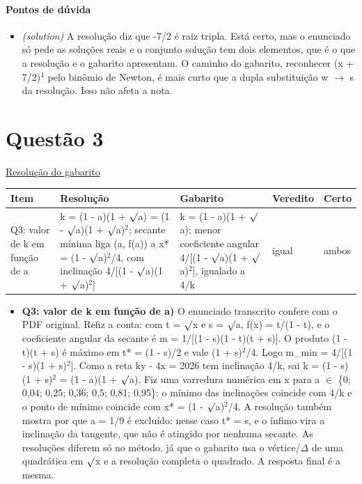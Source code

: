 \documentclass{article}%
\begin{document}
\paragraph{Pontos de dúvida}%
\begin{itemize}%
\item%
\textit{(solution)} A resolução diz que -7/2 é raiz tripla. Está certo, mas o enunciado só pede as soluções reais e o conjunto solução tem dois elementos, que é o que a resolução e o gabarito apresentam. O caminho do gabarito, reconhecer (x + 7/2)$^{4}$ pelo binômio de Newton, é mais curto que a dupla substituição w $\to$ s da resolução. Isso não afeta a nota.%
\end{itemize}%
\section*{Questão 3}%
\href{https://poliedroresolve.sistemapoliedro.com.br/vestibulares/ime/2026/ime-2-fase-dia-1-23-10-2025-2-fase-dia-1/dissertativa-3-matematica-2-fase-dia-1-ime-2026}{Resolução do gabarito}\par\smallskip%
\begin{longtable}{@{}p{} p{} p{} p{} p{}@{}}\toprule Item & Resolução & Gabarito & Veredito & Certo \\ \midrule
Q3: valor de k em função de a & k = (1 - a)(1 + $\surd$a) = (1 - $\surd$a)(1 + $\surd$a)$^2$; secante mínima liga (a, f(a)) a x* = (1 - $\surd$a)$^2$/4, com inclinação 4/{[}(1 - $\surd$a)(1 + $\surd$a)$^2${]} & k = (1 - a)(1 + $\surd$a); menor coeficiente angular 4/{[}(1 - $\surd$a)(1 + $\surd$a)$^2${]}, igualado a 4/k & igual & ambos \\
\bottomrule\end{longtable}%
\begin{itemize}%
\item%
\textbf{Q3: valor de k em função de a)} O enunciado transcrito confere com o PDF original. Refiz a conta: com t = $\surd$x e s = $\surd$a, f(x) = t/(1 - t), e o coeficiente angular da secante é m = 1/{[}(1 - s)(1 - t)(t + s){]}. O produto (1 - t)(t + s) é máximo em t* = (1 - s)/2 e vale (1 + s)$^2$/4. Logo m\_min = 4/{[}(1 - s)(1 + s)$^2${]}. Como a reta ky - 4x = 2026 tem inclinação 4/k, sai k = (1 - s)(1 + s)$^2$ = (1 - a)(1 + $\surd$a). Fiz uma varredura numérica em x para a $\in$ \{0; 0,04; 0,25; 0,36; 0,5; 0,81; 0,95\}: o mínimo das inclinações coincide com 4/k e o ponto de mínimo coincide com x* = (1 - $\surd$a)$^2$/4. A resolução também mostra por que a = 1/9 é excluído: nesse caso t* = s, e o ínfimo vira a inclinação da tangente, que não é atingido por nenhuma secante. As resoluções diferem só no método, já que o gabarito usa o vértice/$\Delta$ de uma quadrática em $\surd$x e a resolução completa o quadrado. A resposta final é a mesma.%
\end{itemize}%
\end{document}
